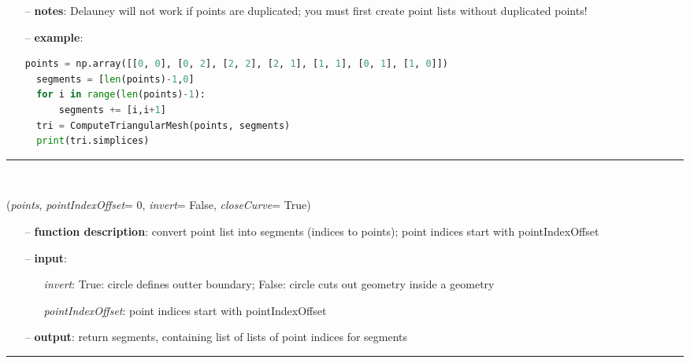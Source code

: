 \begin{itemize}[leftmargin=1.4cm]
\begin{itemize}[leftmargin=1.4cm]
\begin{itemize}[leftmargin=1.4cm]
\begin{itemize}[leftmargin=0.5cm]
\begin{itemize}[leftmargin=1.4cm]
\begin{itemize}[leftmargin=1.4cm]
\begin{itemize}[leftmargin=0.5cm]
\begin{itemize}[leftmargin=1.4cm]
\begin{itemize}[leftmargin=1.4cm]
\begin{itemize}[leftmargin=0.5cm]
\begin{itemize}[leftmargin=0.7cm]
\item[--]
{\bf notes}: Delauney will not work if points are duplicated; you must first create point lists without duplicated points!
\item[--]
{\bf example}: \vspace{-12pt}\ei\begin{lstlisting}[language=Python, xleftmargin=36pt]
  points = np.array([[0, 0], [0, 2], [2, 2], [2, 1], [1, 1], [0, 1], [1, 0]])
  segments = [len(points)-1,0]
  for i in range(len(points)-1):
      segments += [i,i+1]
  tri = ComputeTriangularMesh(points, segments)
  print(tri.simplices)
\end{lstlisting}\vspace{-24pt}\bi\item[]\vspace{-24pt}\vspace{12pt}\end{itemize}
%
\noindent\rule{8cm}{0.75pt}\vspace{1pt} \\ 
\begin{flushleft}
\label{sec:graphicsDataUtilities:SegmentsFromPoints}
({\it points}, {\it pointIndexOffset}= 0, {\it invert}= False, {\it closeCurve}= True)
\end{flushleft}
\setlength{\itemindent}{0.7cm}
\begin{itemize}[leftmargin=0.7cm]
\item[--]
{\bf function description}: convert point list into segments (indices to points); point indices start with pointIndexOffset
\item[--]
{\bf input}: \vspace{-6pt}
\begin{itemize}[leftmargin=1.2cm]
\setlength{\itemindent}{-0.7cm}
\item[]{\it invert}: True: circle defines outter boundary; False: circle cuts out geometry inside a geometry
\item[]{\it pointIndexOffset}: point indices start with pointIndexOffset
\end{itemize}
\item[--]
{\bf output}: return segments, containing list of lists of point indices for segments
\vspace{12pt}\end{itemize}
%
\noindent\rule{8cm}{0.75pt}\vspace{1pt} \\ 

\end{itemize}
\end{itemize}
\end{itemize}
\end{itemize}
\end{itemize}
\end{itemize}
\end{itemize}
\end{itemize}
\end{itemize}
\end{itemize}
